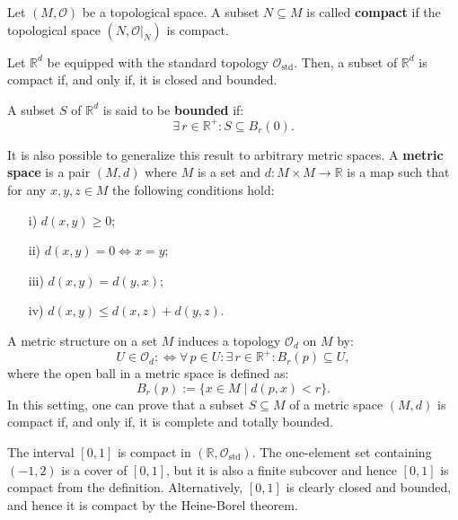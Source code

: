 \documentclass[root.tex]{subfiles}
\begin{document}
\begin{mydef}
Let $(M,\mathcal{O})$ be a topological space. A subset $N\subseteq M$ is called \textbf{compact} if the topological space $(N,\mathcal{O}|_N)$ is compact.
\end{mydef}

\begin{theorem}
Let $\mathbb{R}^d$ be equipped with the standard topology $\mathcal{O}_\mathrm{std}$. Then, a subset of $\mathbb{R}^d$ is compact if, and only if, it is closed and bounded.
\end{theorem}

A subset $S$ of $\mathbb{R}^d$ is said to be \textbf{bounded} if:
$$
\exists \, r \in \mathbb{R}^+ : S \subseteq B_r(0). 
$$

\begin{remark}
It is also possible to generalize this result to arbitrary metric spaces. A \textbf{metric space} is a pair $(M,d)$ where $M$ is a set and $d: M\times M \to \mathbb{R}$ is a map such that for any $x,y,z \in M$ the following conditions hold:
\begin{enumerate}
\item[i)] $d(x,y) \geq 0$;
\item[ii)] $d(x,y) = 0 \Leftrightarrow x = y$;
\item[iii)] $d(x,y) = d(y,x) $;
\item[iv)] $d(x,y)\leq d(x,z)+d(y,z)$.
\end{enumerate}
A metric structure on a set $M$ induces a topology $\mathcal{O}_d$ on $M$ by:
$$
U \in \mathcal{O}_d :\Leftrightarrow \forall \, p \in U : \exists \, r \in \mathbb{R}^+ : B_r(p) \subseteq U,
$$
where the open ball in a metric space is defined as:
$$
B_r(p) := \{x \in M \mid d(p,x) < r\}.
$$
In this setting, one can prove that a subset $S\subseteq M$ of a metric space $(M,d)$ is compact if, and only if, it is complete and totally bounded.
\end{remark}

\begin{myex}
The interval $[0,1]$ is compact in $(\mathbb{R},\mathcal{O}_\mathrm{std})$. The one-element set containing $(-1,2)$ is a cover of $[0,1]$, but it is also a finite subcover and hence $[0,1]$ is compact from the definition. Alternatively, $[0,1]$ is clearly closed and bounded, and hence it is compact by the Heine-Borel theorem.
\end{myex}
\end{document}
